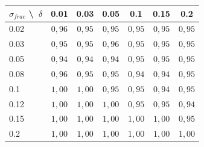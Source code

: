 
\begin{tabular}{@{}lcccccc@{}}
\toprule
$\sigma_{frac}$ \textbackslash\ $\delta$ & 0.01 & 0.03 & 0.05 & 0.1 & 0.15 & 0.2 \\
\midrule
0.02 & $0{,}96$ & $0{,}95$ & $0{,}95$ & $0{,}95$ & $0{,}95$ & $0{,}95$ \\
0.03 & $0{,}95$ & $0{,}95$ & $0{,}96$ & $0{,}95$ & $0{,}95$ & $0{,}95$ \\
0.05 & $0{,}94$ & $0{,}94$ & $0{,}94$ & $0{,}95$ & $0{,}95$ & $0{,}95$ \\
0.08 & $0{,}96$ & $0{,}95$ & $0{,}95$ & $0{,}94$ & $0{,}94$ & $0{,}95$ \\
0.1 & $1{,}00$ & $1{,}00$ & $0{,}95$ & $0{,}95$ & $0{,}94$ & $0{,}95$ \\
0.12 & $1{,}00$ & $1{,}00$ & $1{,}00$ & $0{,}95$ & $0{,}95$ & $0{,}94$ \\
0.15 & $1{,}00$ & $1{,}00$ & $1{,}00$ & $1{,}00$ & $1{,}00$ & $0{,}95$ \\
0.2 & $1{,}00$ & $1{,}00$ & $1{,}00$ & $1{,}00$ & $1{,}00$ & $1{,}00$ \\
\bottomrule
\end{tabular}

